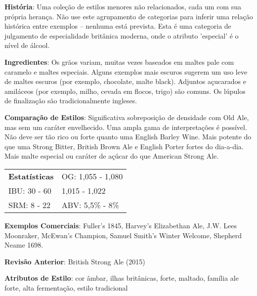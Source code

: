\textbf{História}: Uma coleção de estilos menores não relacionados, cada um com sua própria herança. Não use este agrupamento de categorias para inferir uma relação histórica entre exemplos – nenhuma está prevista. Esta é uma categoria de julgamento de especialidade britânica moderna, onde o atributo 'especial' é o nível de álcool.

\textbf{Ingredientes}: Os grãos variam, muitas vezes baseados em maltes pale com caramelo e maltes especiais. Alguns exemplos mais escuros sugerem um uso leve de maltes escuros (por exemplo, chocolate, malte black). Adjuntos açucarados e amiláceos (por exemplo, milho, cevada em flocos, trigo) são comuns. Os lúpulos de finalização são tradicionalmente ingleses.

\textbf{Comparação de Estilos}: Significativa sobreposição de densidade com Old Ale, mas sem um caráter envelhecido. Uma ampla gama de interpretações é possível. Não deve ser tão rico ou forte quanto uma English Barley Wine. Mais potente do que uma Strong Bitter, British Brown Ale e English Porter fortes do dia-a-dia. Mais malte especial ou caráter de açúcar do que American Strong Ale.

\begin{tabular}{@{}p{35mm}p{35mm}@{}}
  \textbf{Estatísticas} & OG: 1,055 - 1,080 \\
  IBU: 30 - 60  & 1,015 - 1,022  \\
  SRM: 8 - 22  & ABV: 5,5\% - 8\%
\end{tabular}

\textbf{Exemplos Comerciais}: Fuller’s 1845, Harvey’s Elizabethan Ale, J.W. Lees Moonraker, McEwan’s Champion, Samuel Smith’s Winter Welcome, Shepherd Neame 1698.

\textbf{Revisão Anterior}: British Strong Ale (2015)

\textbf{Atributos de Estilo}: cor âmbar, ilhas britânicas, forte, maltado, família ale forte, alta fermentação, estilo tradicional
